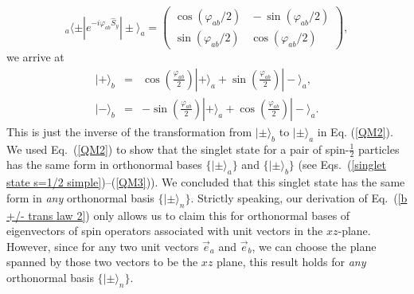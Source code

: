 \begin{equation}
_{a\!}\langle \pm | e^{-i \varphi_{ab} \hat{S}_y} | \pm \rangle_a 
=
\begin{pmatrix} 
\cos(\varphi_{ab}/2) \! & \! -\sin(\varphi_{ab}/2)\\[.3 cm]
\sin(\varphi_{ab}/2) \! & \! \cos(\varphi_{ab}/2)
\end{pmatrix},
\label{spin 1/2 rotation 2}
\end{equation}
we arrive at  
\begin{eqnarray}
|+\rangle_b &\!\!=\!\!& \cos\left(\frac{\varphi_{ab}}{2}\right)|+\rangle_a+\sin\left(\frac{\varphi_{ab}}{2}\right)|-\rangle_a, \nonumber \\[.3 cm]
|-\rangle_b &\!\!=\!\!& - \sin\left(\frac{\varphi_{ab}}{2}\right)|+\rangle_a+\cos\left(\frac{\varphi_{ab}}{2}\right)|-\rangle_a.
\label{b +/- trans law 2}
\end{eqnarray}
This is just the inverse of the transformation from $|\pm \rangle_b$ to $|\pm\rangle_a$ in Eq. (\ref{QM2}). We used Eq.\ (\ref{QM2}) to show that the singlet state for a pair of spin-$\frac12$ particles has the same form in orthonormal bases $\{ | \pm \rangle_a \}$ and $\{ | \pm \rangle_b \}$ (see Eqs.\ (\ref{singlet state s=1/2 simple})--(\ref{QM3})). We concluded that this singlet state has the same form in \emph{any} orthonormal basis  $\{ | \pm \rangle_n \}$. Strictly speaking, our derivation of Eq.\ (\ref{b +/- trans law 2}) only allows us to claim this for orthonormal bases of eigenvectors of spin operators associated with unit vectors in the $xz$-plane. However, since for any two unit vectors $\vec{e}_a$ and $\vec{e}_b$, we can choose the plane spanned by those two vectors to be the $xz$ plane, this result holds for \emph{any} orthonormal basis  $\{ | \pm \rangle_n \}$.

